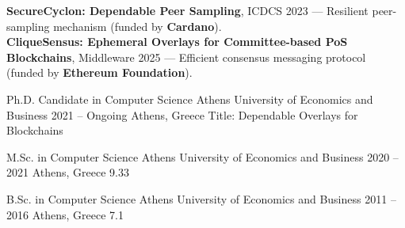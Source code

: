 \documentclass[10pt,a4paper,ragged2e,withhyper]{altacv}
\begin{document}
\begin{paracol}{2}


        \textbf{SecureCyclon: Dependable Peer Sampling}, ICDCS 2023 —
        Resilient peer-sampling mechanism (funded by \textbf{Cardano}). \\[0.5em]

        \textbf{CliqueSensus: Ephemeral Overlays for Committee-based PoS Blockchains}, Middleware 2025 —
        Efficient consensus messaging protocol (funded by \textbf{Ethereum Foundation}).


        \cveducation
          {Ph.D. Candidate in Computer Science}
          {Athens University of Economics and Business}
          {2021 -- Ongoing}
          {Athens, Greece}
          {}
          {Title: Dependable Overlays for Blockchains}

        \cveducation
          {M.Sc. in Computer Science}
          {Athens University of Economics and Business}
          {2020 -- 2021}
          {Athens, Greece}
          {9.33}
          {}

        \cveducation
          {B.Sc. in Computer Science}
          {Athens University of Economics and Business}
          {2011 -- 2016}
          {Athens, Greece}
          {7.1}
          {}

    \end{paracol}
\end{document}

